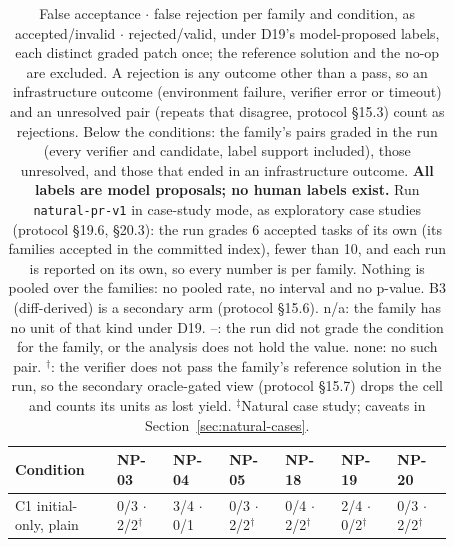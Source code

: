 \begin{table}[t]\centering\scriptsize\setlength{\tabcolsep}{4pt}
\caption{False acceptance $\cdot$ false rejection per family and condition, as accepted/invalid $\cdot$ rejected/valid, under D19's model-proposed labels, each distinct graded patch once; the reference solution and the no-op are excluded. A rejection is any outcome other than a pass, so an infrastructure outcome (environment failure, verifier error or timeout) and an unresolved pair (repeats that disagree, protocol \S15.3) count as rejections. Below the conditions: the family's pairs graded in the run (every verifier and candidate, label support included), those unresolved, and those that ended in an infrastructure outcome. \textbf{All labels are model proposals; no human labels exist.} Run \texttt{natural-pr-v1} in case-study mode, as exploratory case studies (protocol \S19.6, \S20.3): the run grades 6 accepted tasks of its own (its families accepted in the committed index), fewer than 10, and each run is reported on its own, so every number is per family. Nothing is pooled over the families: no pooled rate, no interval and no p-value. B3 (diff-derived) is a secondary arm (protocol \S15.6). n/a: the family has no unit of that kind under D19. --: the run did not grade the condition for the family, or the analysis does not hold the value. none: no such pair. $^{\dagger}$: the verifier does not pass the family's reference solution in the run, so the secondary oracle-gated view (protocol \S15.7) drops the cell and counts its units as lost yield. $^{\ddagger}$Natural case study; caveats in Section~\ref{sec:natural-cases}.}\label{tab:nr-fa-fr}
\begin{tabular}{p{0.2\linewidth}p{0.112\linewidth}p{0.112\linewidth}p{0.112\linewidth}p{0.112\linewidth}p{0.112\linewidth}p{0.112\linewidth}}\toprule Condition & NP-03 & NP-04 & NP-05 & NP-18 & NP-19 & NP-20 \\\midrule
\raggedright\hspace{0pt}C1 initial-only, plain & \raggedright\hspace{0pt}0/3 $\cdot$ 2/2$^{\dagger}$ & \raggedright\hspace{0pt}3/4 $\cdot$ 0/1 & \raggedright\hspace{0pt}0/3 $\cdot$ 2/2$^{\dagger}$ & \raggedright\hspace{0pt}0/4 $\cdot$ 2/2$^{\dagger}$ & \raggedright\hspace{0pt}2/4 $\cdot$ 0/2$^{\dagger}$ & \raggedright\hspace{0pt}0/3 $\cdot$ 2/2$^{\dagger}$ \tabularnewline

\end{tabular}
\end{table}
